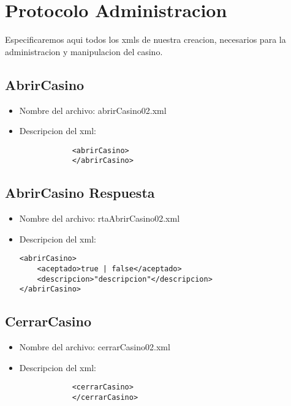 \section{Protocolo Administracion}
\label{sec:ProtocoloAdministracion}

Especificaremos aqui todos los xmls de nuestra creacion, necesarios para la administracion y manipulacion del casino.


\subsection{AbrirCasino}
\label{sec:AbrirCasino}

\begin{itemize}
	\item Nombre del archivo: abrirCasino02.xml
	\item Descripcion del xml:
		\begin{verbatim}
			<abrirCasino>
			</abrirCasino>
		\end{verbatim}
\end{itemize}

\subsection{AbrirCasino Respuesta}
\label{sec:AbrirCasinoRespuesta}

\begin{itemize}
	\item Nombre del archivo: rtaAbrirCasino02.xml
	\item Descripcion del xml:
		\begin{verbatim}
<abrirCasino>
    <aceptado>true | false</aceptado>			
    <descripcion>"descripcion"</descripcion>
</abrirCasino>
		\end{verbatim}
\end{itemize}

\subsection{CerrarCasino}
\label{sec:CerrarCasino}

\begin{itemize}
	\item Nombre del archivo: cerrarCasino02.xml
	\item Descripcion del xml:
		\begin{verbatim}
			<cerrarCasino>
			</cerrarCasino>
		\end{verbatim}
\end{itemize}

